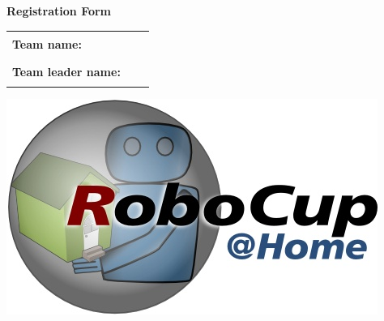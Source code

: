 \newpage

\begin{minipage}[t]{0.8\textwidth}%

\vspace{0pt}
{\huge \textbf{Registration Form} }

\vspace{5 em}

\newcommand{\rightRule}{\rule{0.7\linewidth}{.2pt}}

\begin{tabular}{ @{} l l l}

\textbf{Team name:} & \rightRule \\[.9 em]%

\textbf{Team leader name:} & \rightRule \\[.9 em]%




\end{tabular}

\vspace{1 em}

\end{minipage}
\hfill
\begin{minipage}[t]{0.15\textwidth}%
\vspace{0pt}
	\includegraphics[width=\textwidth]{images/logo_RoboCupAtHome.jpg}%
\end{minipage}\\

